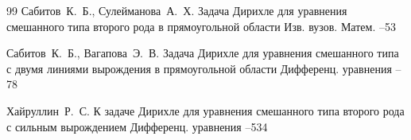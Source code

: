 \begin{thebibliography}{99}
\by Сабитов~К.~Б., Сулейманова~А.~Х.
\paper Задача Дирихле для уравнения смешанного типа второго рода в прямоугольной области
\jour Изв. вузов. Матем.
--53

\by Сабитов~К.~Б., Вагапова~Э.~В.
\paper Задача Дирихле для уравнения смешанного типа с двумя линиями вырождения в прямоугольной области
\jour Дифференц. уравнения
--78

\by Хайруллин~Р.~С.
\paper К задаче Дирихле для уравнения смешанного типа второго рода с сильным вырождением
\jour Дифференц. уравнения
--534


\end{thebibliography}
